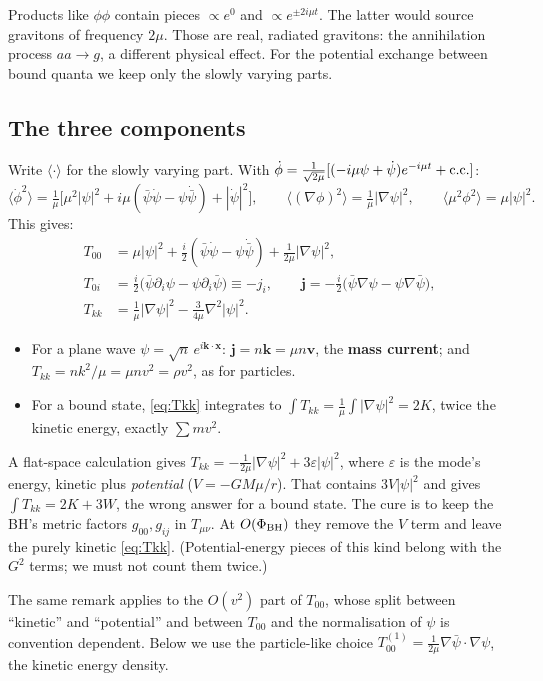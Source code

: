 \documentclass[11pt]{article}
\newcommand{\bx}{\mathbf{x}}\newcommand{\by}{\mathbf{y}}\newcommand{\bv}{\mathbf{v}}
\newcommand{\bj}{\mathbf{j}}\newcommand{\bA}{\mathbf{A}}\newcommand{\bn}{\mathbf{n}}
\begin{document}
\begin{idea}
Products like $\phi\phi$ contain pieces $\propto e^{0}$ and $\propto e^{\pm2i\mu t}$. The latter would source gravitons of frequency $2\mu$. Those are real, radiated gravitons: the annihilation process $aa\to g$, a different physical effect. For the potential exchange between bound quanta we keep only the slowly varying parts.
\end{idea}

\subsection{The three components}
Write $\langle\cdot\rangle$ for the slowly varying part. With $\dot\phi=\tfrac1{\sqrt{2\mu}}[(-i\mu\psi+\dot\psi)e^{-i\mu t}+{\rm c.c.}]$:
\[
\langle\dot\phi^2\rangle=\tfrac1\mu\big[\mu^2|\psi|^2+i\mu(\bar\psi\dot\psi-\psi\dot{\bar\psi})+|\dot\psi|^2\big],\qquad
\langle(\nabla\phi)^2\rangle=\tfrac1\mu|\nabla\psi|^2,\qquad
\langle\mu^2\phi^2\rangle=\mu|\psi|^2.
\]
This gives:
\begin{align}
T_{00}&=\mu|\psi|^2+\tfrac{i}{2}(\bar\psi\dot\psi-\psi\dot{\bar\psi})+\tfrac{1}{2\mu}|\nabla\psi|^2,\label{eq:T00}\\
T_{0i}&=\tfrac{i}{2}\big(\bar\psi\partial_i\psi-\psi\partial_i\bar\psi\big)\equiv-j_i,\qquad \bj=-\tfrac{i}{2}\big(\bar\psi\nabla\psi-\psi\nabla\bar\psi\big),\label{eq:T0i}\\
T_{kk}&=\tfrac1\mu|\nabla\psi|^2-\tfrac{3}{4\mu}\nabla^2|\psi|^2.\label{eq:Tkk}
\end{align}
\begin{verify}
\begin{itemize}[nosep]
\item For a plane wave $\psi=\sqrt n\,e^{i\mathbf k\cdot\bx}$: $\bj=n\mathbf k=\mu n\bv$, the \textbf{mass current}; and $T_{kk}=nk^2/\mu=\mu nv^2=\rho v^2$, as for particles.
\item For a bound state, \eqref{eq:Tkk} integrates to $\int T_{kk}=\tfrac1\mu\int|\nabla\psi|^2=2K$, twice the kinetic energy, exactly $\sum mv^2$.
\end{itemize}
\end{verify}
\begin{idea}
A flat-space calculation gives $T_{kk}=-\tfrac1{2\mu}|\nabla\psi|^2+3\varepsilon|\psi|^2$, where $\varepsilon$ is the mode's energy, kinetic plus \emph{potential} ($V=-GM\mu/r$). That contains $3V|\psi|^2$ and gives $\int T_{kk}=2K+3W$, the wrong answer for a bound state. The cure is to keep the BH's metric factors $g_{00},g_{ij}$ in $T_{\mu\nu}$. At $O(\Phi_{\rm BH})$ they remove the $V$ term and leave the purely kinetic \eqref{eq:Tkk}. (Potential-energy pieces of this kind belong with the $G^2$ terms; we must not count them twice.)

The same remark applies to the $O(v^2)$ part of $T_{00}$, whose split between ``kinetic'' and ``potential'' and between $T_{00}$ and the normalisation of $\psi$ is convention dependent. Below we use the particle-like choice $T_{00}^{(1)}=\tfrac1{2\mu}\nabla\bar\psi\cdot\nabla\psi$, the kinetic energy density.
\end{idea}
\end{document}
